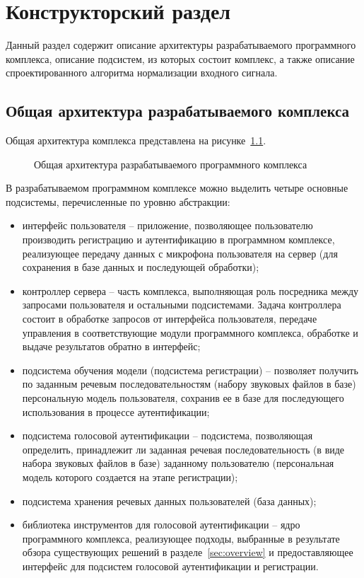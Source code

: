 \chapter{Конструкторский раздел}
Данный раздел содержит описание архитектуры разрабатываемого программного комплекса, описание подсистем, из которых состоит комплекс, а также описание спроектированного алгоритма нормализации входного сигнала.

\section{Общая архитектура разрабатываемого комплекса}
\label{sec:main_arch}

Общая архитектура комплекса представлена на рисунке~\ref{fig:main_arch}.

\begin{figure}[h]
    \caption{Общая архитектура разрабатываемого программного комплекса}
    \label{fig:main_arch}
\end{figure}

В разрабатываемом программном комплексе можно выделить четыре основные подсистемы, перечисленные по уровню абстракции:
\begin{itemize}
\item интерфейс пользователя -- приложение, позволяющее пользователю производить регистрацию и аутентификацию в программном комплексе, реализующее передачу данных с микрофона пользователя на сервер (для сохранения в базе данных и последующей обработки);
\item контроллер сервера -- часть комплекса, выполняющая роль посредника между запросами пользователя и остальными подсистемами. Задача контроллера состоит в обработке запросов от интерфейса пользователя, передаче управления в соответствующие модули программного комплекса, обработке и выдаче результатов обратно в интерфейс;
\item подсистема обучения модели (подсистема регистрации) -- позволяет получить по заданным речевым последовательностям (набору звуковых файлов в базе) персональную модель пользователя, сохранив ее в базе для последующего использования в процессе аутентификации;
\item подсистема голосовой аутентификации -- подсистема, позволяющая определить, принадлежит ли заданная речевая последовательность (в виде набора звуковых файлов в базе) заданному пользователю (персональная модель которого создается на этапе регистрации);
\item подсистема хранения речевых данных пользователей (база данных);
\item библиотека инструментов для голосовой аутентификации -- ядро программного комплекса, реализующее подходы, выбранные в результате обзора существующих решений в разделе~\ref{sec:overview} и предоставляющее интерфейс для подсистем голосовой аутентификации и регистрации.
\end{itemize}

